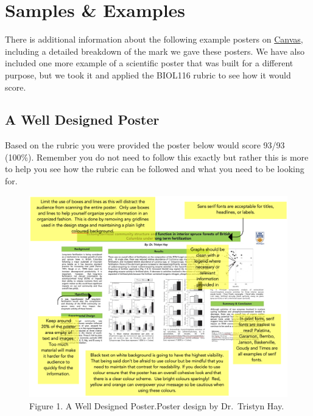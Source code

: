 \documentclass[
]{book}
\begin{document}
\hypertarget{samples-examples}{%
\chapter*{Samples \& Examples}\label{samples-examples}}

There is additional information about the following example posters on \href{https://canvas.ubc.ca}{Canvas}, including a detailed breakdown of the mark we gave these posters. We have also included one more example of a scientific poster that was built for a different purpose, but we took it and applied the BIOL116 rubric to see how it would score.

\hypertarget{a-well-designed-poster}{%
\section*{A Well Designed Poster}\label{a-well-designed-poster}}

Based on the rubric you were provided the poster below would score 93/93 (100\%). Remember you do not need to follow this exactly but rather this is more to help you see how the rubric can be followed and what you need to be looking for.

\begin{figure}
\centering
\includegraphics{figures_images/Lab10-Fig1.png}
\caption{Figure 1. A Well Designed Poster.Poster design by Dr.~Tristyn Hay.}
\end{figure}
\end{document}

